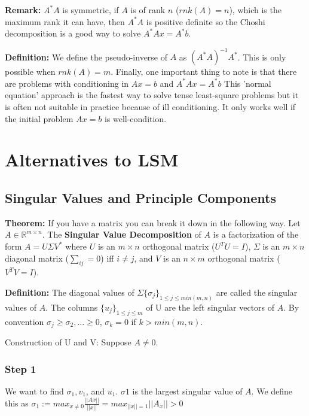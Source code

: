\documentclass{article}
\newcommand{\n}{\newline}
\begin{document}
	\textbf{Remark: }$A^{*}A$ is symmetric, if $A$ is of rank $n$ ($rnk(A)=n$), which is the maximum rank it can have, then $A^{*}A$ is positive definite so the Choshi decomposition is a good way to solve $A^{*}Ax=A^{*}b$.\n
	
	\textbf{Definition: } We define the pseudo-inverse of $A$ as $(A^{*}A)^{-1}A^{*}$.  This is only possible when $rnk(A)=m$.  Finally, one important thing to note is that there are problems with conditioning in $Ax=b$ and $A^{*}Ax=A^{*}b$  This 'normal equation' approach is the fastest way to solve tense least-square problems but it is often not suitable in practice because of ill conditioning.  It only works well if the initial problem $Ax=b$ is well-condition.
	
	\section{Alternatives to LSM}
	
	\subsection{Singular Values and Principle Components}
	
	\textbf{Theorem: }If you have a matrix you can break it down in the following way.  Let $A\in\mathbb{R}^{m\times n}$.  The \textbf{Singular Value Decomposition} of $A$ is a factorization of the form $A=U\Sigma V^{*}$ where $U$ is an $m\times n$ orthogonal matrix ($U^{T}U=I$), $\Sigma$ is an $m\times n$ diagonal matrix ($\sum_{ij}=0$) iff $i\neq j$, and $V$ is an $n\times m$ orthogonal matrix ($V^{T}V=I$).  \n
	
	\textbf{Definition: }The diagonal values of $\Sigma\{\sigma_{j}\}_{1\leq j\leq min(m,n)}$ are called the singular values of $A$.  The columns $\{u_{j}\}_{1\leq j \leq m}$ of U are the left singular vectors of $A$.  By convention $\sigma_{j}\geq \sigma_{2},...\geq 0$, $\sigma_{k}=0$ if $k>min(m,n)$.\n
	
	Construction of U and V:  Suppose $A\neq 0$.\n
	
	\subsubsection{Step 1}
	
	We want to find $\sigma_{1},v_{1}$, and $u_{1}$.  $\sigma{1}$ is the largest singular value of $A$.  We define this as $\sigma_{1}:=max_{x\neq0}\frac{||Ax||}{||x||}=max_{||x||=1}||A_{x}||>0$\n
	
\end{document}
